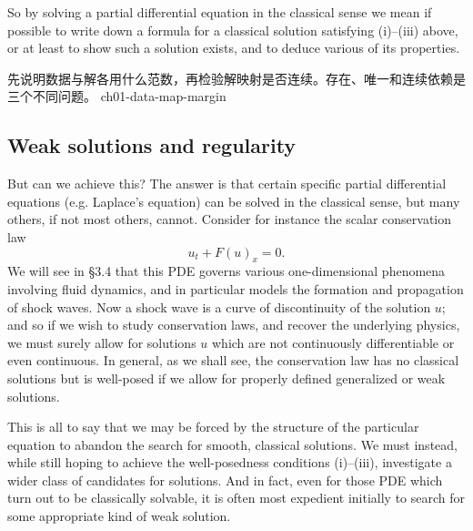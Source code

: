 So by solving a partial differential equation in the classical sense we mean if possible to write down a formula for a classical solution satisfying (i)--(iii) above, or at least to show such a solution exists, and to deduce various of its properties.


{先说明数据与解各用什么范数，再检验解映射是否连续。存在、唯一和连续依赖是三个不同问题。}
{ch01-data-map-margin}

\subsection{Weak solutions and regularity} But can we achieve this? The answer is that certain specific partial differential equations (e.g. Laplace's equation) can be solved in the classical sense, but many others, if not most others, cannot. Consider for instance the scalar conservation law \[ u_t+F(u)_x=0. \] We will see in \S3.4 that this PDE governs various one-dimensional phenomena involving fluid dynamics, and in particular models the formation and propagation of shock waves. Now a shock wave is a curve of discontinuity of the solution $u$; and so if we wish to study conservation laws, and recover the underlying physics, we must surely allow for solutions $u$ which are not continuously differentiable or even continuous. In general, as we shall see, the conservation law has no classical solutions but is well-posed if we allow for properly defined generalized or weak solutions. \par\Needspace{65mm}

This is all to say that we may be forced by the structure of the particular equation to abandon the search for smooth, classical solutions. We must instead, while still hoping to achieve the well-posedness conditions (i)--(iii), investigate a wider class of candidates for solutions. And in fact, even for those PDE which turn out to be classically solvable, it is often most expedient initially to search for some appropriate kind of weak solution.

